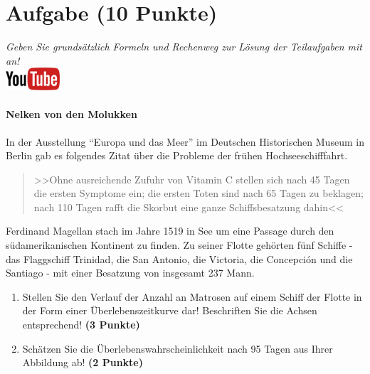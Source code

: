 \documentclass[a4paper, 9pt]{scrartcl}\usepackage[]{graphicx}\usepackage[]{xcolor}
\begin{document}
 
\clearpage

\section{Aufgabe \hfill (10 Punkte)}

\textit{Geben Sie grunds{\"a}tzlich Formeln und Rechenweg zur L{\"o}sung der
  Teilaufgaben mit an!} \\[1Ex]

\hfill\href{https://youtu.be/1B53cVFIU7Q}{\includegraphics[width =
  2cm]{img/youtube}} %
\hspace{2Ex}

\paragraph{Nelken von den Molukken}



In der Ausstellung "`Europa und das Meer"' im Deutschen Historischen Museum in
Berlin gab es folgendes Zitat {\"u}ber die Probleme der fr{\"u}hen Hochseeschifffahrt.

\begin{quote}
  >>Ohne ausreichende Zufuhr von Vitamin C stellen sich nach 45 Tagen die
  ersten Symptome ein; die ersten Toten sind nach 65 Tagen zu beklagen;
  nach 110 Tagen rafft die Skorbut eine ganze Schiffsbesatzung dahin<<
\end{quote}

Ferdinand Magellan stach im Jahre 1519 in See um eine Passage durch den
s{\"u}damerikanischen Kontinent zu finden. Zu seiner Flotte geh{\"o}rten
f{\"u}nf Schiffe - das Flaggschiff Trinidad, die San Antonio, die Victoria, die
Concepci{\'o}n und die Santiago - mit einer Besatzung von insgesamt
237 Mann. 

\begin{enumerate}
\item Stellen Sie den Verlauf der Anzahl an Matrosen auf einem Schiff der
  Flotte in der Form einer {\"U}berlebenszeitkurve dar! Beschriften Sie die
  Achsen entsprechend! \textbf{(3 Punkte)} 
\item Sch{\"a}tzen Sie die {\"U}berlebenswahrscheinlichkeit nach 95 Tagen
  aus Ihrer Abbildung ab! \textbf{(2 Punkte)} 
\end{enumerate}
\end{document}
